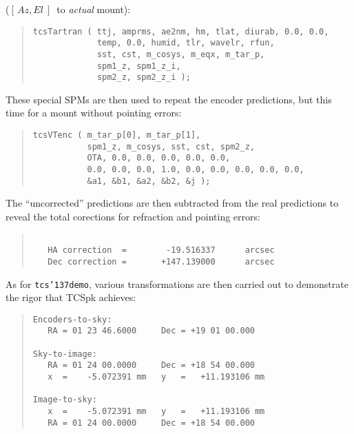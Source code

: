 \documentclass[12pt,fleqn,twoside]{article}
\renewcommand{\_}{{\tt\char'137}}     %
\newcommand{\azel}      {$[\,Az,El~]$}
\begin{document}
(\azel\ to {\it actual}\/ mount):
\begin{quote}
\begin{small}
\begin{verbatim}
tcsTartran ( ttj, amprms, ae2nm, hm, tlat, diurab, 0.0, 0.0,
             temp, 0.0, humid, tlr, wavelr, rfun,
             sst, cst, m_cosys, m_eqx, m_tar_p,
             spm1_z, spm1_z_i,
             spm2_z, spm2_z_i );
\end{verbatim}\end{small}
\end{quote}
These special SPMs are then used to repeat the encoder predictions,
but this time for a mount without pointing errors:
\begin{quote}
\begin{small}
\begin{verbatim}
tcsVTenc ( m_tar_p[0], m_tar_p[1],
           spm1_z, m_cosys, sst, cst, spm2_z,
           OTA, 0.0, 0.0, 0.0, 0.0, 0.0,
           0.0, 0.0, 0.0, 1.0, 0.0, 0.0, 0.0, 0.0, 0.0,
           &a1, &b1, &a2, &b2, &j );
\end{verbatim}\end{small}
\end{quote}
The ``uncorrected'' predictions are then subtracted from the
real predictions to reveal the total corections for refraction
and pointing errors:
\begin{quote}
\begin{small}
   \begin{verbatim}

   HA correction  =        -19.516337      arcsec
   Dec correction =       +147.139000      arcsec
\end{verbatim}\end{small}
\end{quote}
As for {\tt tcs\_demo}, various transformations are then
carried out to demonstrate the rigor that TCSpk achieves:
\begin{quote}
\begin{small}
\begin{verbatim}
Encoders-to-sky:
   RA = 01 23 46.6000     Dec = +19 01 00.000

Sky-to-image:
   RA = 01 24 00.0000     Dec = +18 54 00.000
   x  =    -5.072391 mm   y   =   +11.193106 mm

Image-to-sky:
   x  =    -5.072391 mm   y   =   +11.193106 mm
   RA = 01 24 00.0000     Dec = +18 54 00.000
\end{verbatim}\end{small}
\end{quote}
\end{document}
